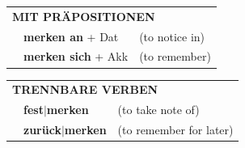 \documentclass[10pt,a4paper]{revtex4-2}
\begin{document}
\begin{verbbox}
\vspace{10pt}

\begin{tabular}{lll}
\multicolumn{3}{l}{\textbf{MIT PRÄPOSITIONEN}}\\
& \textbf{merken an} + Dat & (to notice in)\\
& \textbf{merken sich} + Akk & (to remember)\\
\end{tabular}
\hfill
\begin{tabular}{lll}
\multicolumn{3}{l}{\textbf{TRENNBARE VERBEN}}\\
& \textbf{fest$|$merken} & (to take note of)\\
& \textbf{zurück$|$merken} & (to remember for later)\\
\end{tabular}
\vspace{-5pt}
\end{verbbox}
\end{document}
